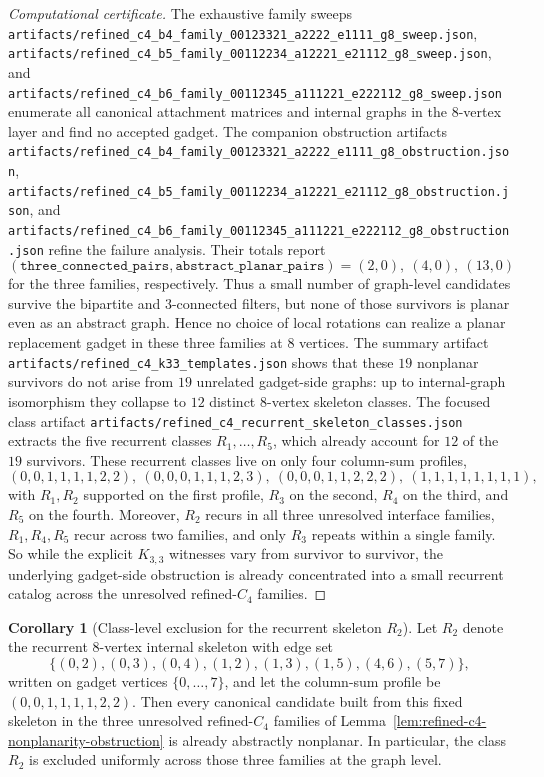 \documentclass[12pt]{article}
\theoremstyle{definition}
\newtheorem{corollary}[theorem]{Corollary}
\begin{document}
\begin{proof}[Computational certificate]
The exhaustive family sweeps \texttt{artifacts/refined\_c4\_b4\_family\_00123321\_a2222\_e1111\_g8\_sweep.json}, \texttt{artifacts/refined\_c4\_b5\_family\_00112234\_a12221\_e21112\_g8\_sweep.json}, and \texttt{artifacts/refined\_c4\_b6\_family\_00112345\_a111221\_e222112\_g8\_sweep.json} enumerate all canonical attachment matrices and internal graphs in the $8$-vertex layer and find no accepted gadget. The companion obstruction artifacts \texttt{artifacts/refined\_c4\_b4\_family\_00123321\_a2222\_e1111\_g8\_obstruction.json}, \texttt{artifacts/refined\_c4\_b5\_family\_00112234\_a12221\_e21112\_g8\_obstruction.json}, and \texttt{artifacts/refined\_c4\_b6\_family\_00112345\_a111221\_e222112\_g8\_obstruction.json} refine the failure analysis. Their totals report
\[
(\texttt{three\_connected\_pairs},\texttt{abstract\_planar\_pairs})=(2,0),\ (4,0),\ (13,0)
\]
for the three families, respectively. Thus a small number of graph-level candidates survive the bipartite and $3$-connected filters, but none of those survivors is planar even as an abstract graph. Hence no choice of local rotations can realize a planar replacement gadget in these three families at $8$ vertices. The summary artifact \texttt{artifacts/refined\_c4\_k33\_templates.json} shows that these $19$ nonplanar survivors do not arise from $19$ unrelated gadget-side graphs: up to internal-graph isomorphism they collapse to $12$ distinct $8$-vertex skeleton classes. The focused class artifact \texttt{artifacts/refined\_c4\_recurrent\_skeleton\_classes.json} extracts the five recurrent classes $R_1,\dots,R_5$, which already account for $12$ of the $19$ survivors. These recurrent classes live on only four column-sum profiles,
\[
(0,0,1,1,1,1,2,2),\ (0,0,0,1,1,1,2,3),\ (0,0,0,1,1,2,2,2),\ (1,1,1,1,1,1,1,1),
\]
with $R_1,R_2$ supported on the first profile, $R_3$ on the second, $R_4$ on the third, and $R_5$ on the fourth. Moreover, $R_2$ recurs in all three unresolved interface families, $R_1,R_4,R_5$ recur across two families, and only $R_3$ repeats within a single family. So while the explicit $K_{3,3}$ witnesses vary from survivor to survivor, the underlying gadget-side obstruction is already concentrated into a small recurrent catalog across the unresolved refined-$C_4$ families.
\end{proof}

\begin{corollary}[Class-level exclusion for the recurrent skeleton $R_2$]
\label{cor:r2-class-exclusion}
Let $R_2$ denote the recurrent $8$-vertex internal skeleton with edge set
\[
\{(0,2),(0,3),(0,4),(1,2),(1,3),(1,5),(4,6),(5,7)\},
\]
written on gadget vertices $\{0,\dots,7\}$, and let the column-sum profile be $(0,0,1,1,1,1,2,2)$. Then every canonical candidate built from this fixed skeleton in the three unresolved refined-$C_4$ families of Lemma~\ref{lem:refined-c4-nonplanarity-obstruction} is already abstractly nonplanar. In particular, the class $R_2$ is excluded uniformly across those three families at the graph level.
\end{corollary}
\end{document}
